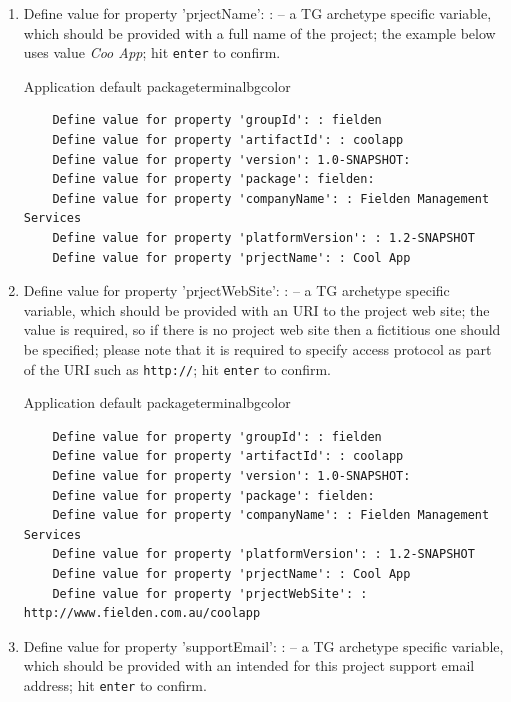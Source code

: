 \begin{enumerate}
    
    \item Define value for property 'prjectName': : -- a TG archetype specific variable, which should be provided with a full name of the project; the example below uses value \emph{Coo App}; hit \texttt{enter} to confirm.
    
    \begin{code}{Application default package}{\label{lst::archetype-package}}{terminalbgcolor}
      \begin{lstlisting}
	Define value for property 'groupId': : fielden		
	Define value for property 'artifactId': : coolapp
	Define value for property 'version': 1.0-SNAPSHOT:
	Define value for property 'package': fielden:
	Define value for property 'companyName': : Fielden Management Services
	Define value for property 'platformVersion': : 1.2-SNAPSHOT
	Define value for property 'prjectName': : Cool App
      \end{lstlisting}
    \end{code}

    \item Define value for property 'prjectWebSite': : -- a TG archetype specific variable, which should be provided with an URI to the project web site; the value is required, so if there is no project web site then a fictitious one should be specified; please note that it is required to specify access protocol as part of the URI such as \texttt{http://}; hit \texttt{enter} to confirm.
    
    \begin{code}{Application default package}{\label{lst::archetype-package}}{terminalbgcolor}
      \begin{lstlisting}
	Define value for property 'groupId': : fielden		
	Define value for property 'artifactId': : coolapp
	Define value for property 'version': 1.0-SNAPSHOT:
	Define value for property 'package': fielden:	
	Define value for property 'companyName': : Fielden Management Services
	Define value for property 'platformVersion': : 1.2-SNAPSHOT
	Define value for property 'prjectName': : Cool App
	Define value for property 'prjectWebSite': : http://www.fielden.com.au/coolapp
      \end{lstlisting}
    \end{code}

    \item Define value for property 'supportEmail': : -- a TG archetype specific variable, which should be provided with an intended for this project support email address; hit \texttt{enter} to confirm.
    

\end{enumerate}
